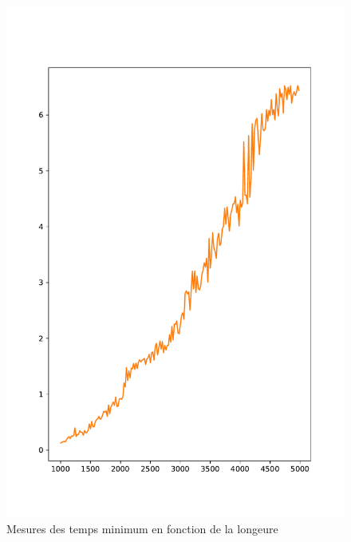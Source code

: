 \documentclass[a4paper,10pt,french]{article}
\begin{document}
    \begin{figure}[h]
      \begin{center}
		  \includegraphics{rapport/cost.pdf}
		  \caption{Mesures des temps minimum en fonction de la longeure}
		  \label{graph-temps}
      \end{center}
    \end{figure}
\end{document}
